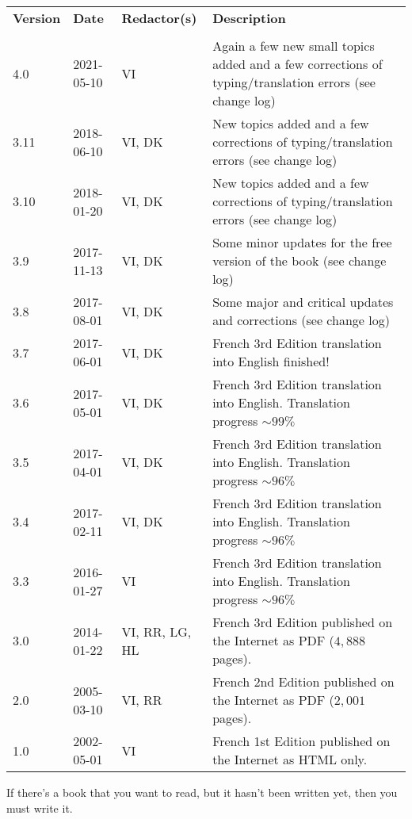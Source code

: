 \documentclass[12pt,a4paper,twoside,openright]{report}
\newcounter{quot}
\theoremstyle{definition}
\theoremstyle{itexmp}
\numberwithin{equation}{section}
\begin{document}
	\begin{table}[H]
		\centering
		\begin{tabular}{lllp{8cm}}
		\textbf{Version} & \textbf{Date} & \textbf{Redactor(s)} & \textbf{Description} \\
		 &  &  &  \\
		4.0 & 2021-05-10 & VI & Again a few new small topics added and a few corrections of typing/translation errors (see change log) \\
		3.11 & 2018-06-10 & VI, DK & New topics added and a few corrections of typing/translation errors (see change log) \\
		3.10 & 2018-01-20 & VI, DK & New topics added and a few corrections of typing/translation errors (see change log) \\
		3.9 & 2017-11-13 & VI, DK & Some minor updates for the free version of the book (see change log) \\
		3.8 & 2017-08-01 & VI, DK & Some major and critical updates and corrections (see change log) \\
		3.7 & 2017-06-01 & VI, DK & French 3rd Edition translation into English finished! \\
		3.6 & 2017-05-01 & VI, DK & French 3rd Edition translation into English. Translation progress $\sim 99\%$ \\
		3.5 & 2017-04-01 & VI, DK & French 3rd Edition translation into English. Translation progress $\sim 96\%$ \\
		3.4 & 2017-02-11 & VI, DK & French 3rd Edition translation into English. Translation progress $\sim 96\%$ \\
		3.3 & 2016-01-27 & VI & French 3rd Edition translation into English. Translation progress $\sim 96\%$ \\
		3.0 & 2014-01-22 & VI, RR, LG, HL & French 3rd Edition published on the Internet as PDF ($4,888$ pages). \\
		2.0 & 2005-03-10 & VI, RR & French 2nd Edition published on the Internet as PDF ($2,001$ pages). \\
		1.0 & 2002-05-01 & VI & French 1st Edition published on the Internet as HTML only. \\
		\end{tabular}
	\end{table}
	
	\pagebreak
	\begin{fquote}If there's a book that you want to read, but it hasn't been written yet, then you must write it.
 	\end{fquote}
 	
\end{document}
